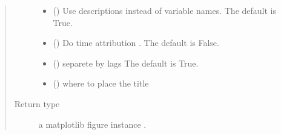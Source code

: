 \documentclass[letterpaper,10pt,english]{sphinxmanual}
\begin{document}
\begin{fulllineitems}
\begin{fulllineitems}
\begin{quote}
\begin{description}
\begin{itemize}
\item {} 
\sphinxAtStartPar
{} (\sphinxstyleliteralemphasis{\sphinxupquote{, }}) \textendash{} Use descriptions instead of variable names. The default is True.

\item {} 
\sphinxAtStartPar
{} (\sphinxstyleliteralemphasis{\sphinxupquote{, }}) \textendash{} Do time attribution . The default is False.

\item {} 
\sphinxAtStartPar
{} (\sphinxstyleliteralemphasis{\sphinxupquote{, }}) \textendash{} separete by lags The default is True.

\item {} 
\sphinxAtStartPar
{} (\sphinxstyleliteralemphasis{\sphinxupquote{, }}) \textendash{} where to place the title

\end{itemize}

\item[{Return type}] \leavevmode
\sphinxAtStartPar
a matplotlib figure instance .

\end{description}\end{quote}

\end{fulllineitems}



\end{fulllineitems}
\end{document}
